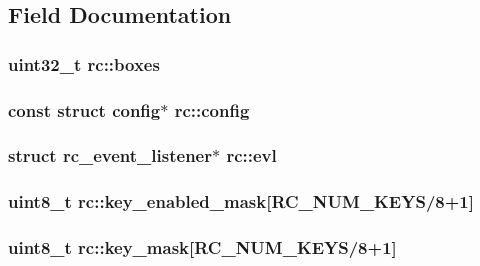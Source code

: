 \subsection{Field Documentation}
\hypertarget{structrc_a8affeb79d786c16752fde7dc1758eb36}{
\subsubsection[{boxes}]{\setlength{\rightskip}{0pt plus 5cm}uint32\+\_\+t rc\+::boxes}}\label{structrc_a8affeb79d786c16752fde7dc1758eb36}
\hypertarget{structrc_a4cf950c3fbd19e35a743adeb6ae06031}{
\subsubsection[{config}]{\setlength{\rightskip}{0pt plus 5cm}const struct {\bf config}$\ast$ rc\+::config}}\label{structrc_a4cf950c3fbd19e35a743adeb6ae06031}
\hypertarget{structrc_aa9d91f7afe038418779187d52e0eeb22}{
\subsubsection[{evl}]{\setlength{\rightskip}{0pt plus 5cm}struct {\bf rc\+\_\+event\+\_\+listener}$\ast$ rc\+::evl}}\label{structrc_aa9d91f7afe038418779187d52e0eeb22}
\hypertarget{structrc_adbe93bdd991cf5dce29b8a560ebd5176}{
\subsubsection[{key\+\_\+enabled\+\_\+mask}]{\setlength{\rightskip}{0pt plus 5cm}uint8\+\_\+t rc\+::key\+\_\+enabled\+\_\+mask\mbox{[}{\bf R\+C\+\_\+\+N\+U\+M\+\_\+\+K\+E\+Y\+S}/8+1\mbox{]}}}\label{structrc_adbe93bdd991cf5dce29b8a560ebd5176}
\hypertarget{structrc_a2fb4afd6728a7c78922c6facb548e658}{
\subsubsection[{key\+\_\+mask}]{\setlength{\rightskip}{0pt plus 5cm}uint8\+\_\+t rc\+::key\+\_\+mask\mbox{[}{\bf R\+C\+\_\+\+N\+U\+M\+\_\+\+K\+E\+Y\+S}/8+1\mbox{]}}}\label{structrc_a2fb4afd6728a7c78922c6facb548e658}


